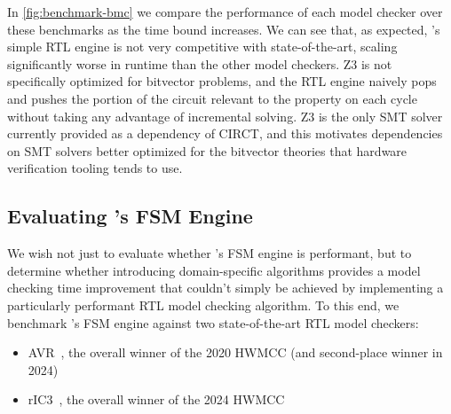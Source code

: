 \documentclass[acmsmall,screen,review]{acmart}
\begin{document}
In \autoref{fig:benchmark-bmc} we compare the performance of each model checker over these benchmarks as the time bound increases.
We can see that, as expected, \toolname{}'s simple RTL engine is not very competitive with state-of-the-art, scaling significantly worse in runtime than the other model checkers.
Z3 is not specifically optimized for bitvector problems, and the RTL engine naively pops and pushes the portion of the circuit relevant to the property on each cycle without taking any advantage of incremental solving.
Z3 is the only SMT solver currently provided as a dependency of CIRCT, and this motivates dependencies on SMT solvers better optimized for the bitvector theories that hardware verification tooling tends to use.

\subsection{Evaluating \toolname{}'s FSM Engine}

We wish not just to evaluate whether \toolname{}'s FSM engine is performant, but to determine whether introducing domain-specific algorithms provides a model checking time improvement that couldn't simply be achieved by implementing a particularly performant RTL model checking algorithm.
To this end, we benchmark \toolname{}'s FSM engine against two state-of-the-art RTL model checkers:

\begin{itemize}
  \item{AVR~\cite{avr}, the overall winner of the 2020 HWMCC (and second-place winner in 2024)}
  \item{rIC3~\cite{ric3}, the overall winner of the 2024 HWMCC}
\end{itemize}
\end{document}
